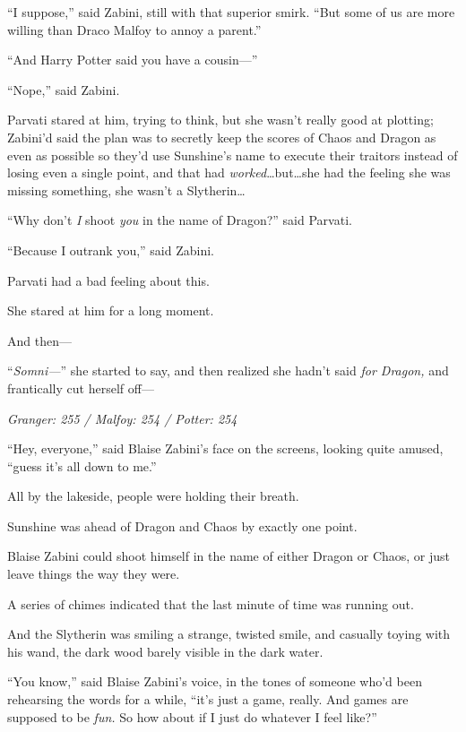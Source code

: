 “I suppose,” said Zabini, still with that superior smirk. “But some of us are more willing than Draco Malfoy to annoy a parent.”

“And Harry Potter said you have a cousin—”

“Nope,” said Zabini.

Parvati stared at him, trying to think, but she wasn’t really good at plotting; Zabini’d said the plan was to secretly keep the scores of Chaos and Dragon as even as possible so they’d use Sunshine’s name to execute their traitors instead of losing even a single point, and that had \emph{worked}…but…she had the feeling she was missing something, she wasn’t a Slytherin…

“Why don’t \emph{I} shoot \emph{you} in the name of Dragon?” said Parvati.

“Because I outrank you,” said Zabini.

Parvati had a bad feeling about this.

She stared at him for a long moment.

And then—

“\emph{Somni—}” she started to say, and then realized she hadn’t said \emph{for Dragon,} and frantically cut herself off—

\later

\emph{Granger: 255 / Malfoy: 254 / Potter: 254}

“Hey, everyone,” said Blaise Zabini’s face on the screens, looking quite amused, “guess it’s all down to me.”

All by the lakeside, people were holding their breath.

Sunshine was ahead of Dragon and Chaos by exactly one point.

Blaise Zabini could shoot himself in the name of either Dragon or Chaos, or just leave things the way they were.

A series of chimes indicated that the last minute of time was running out.

And the Slytherin was smiling a strange, twisted smile, and casually toying with his wand, the dark wood barely visible in the dark water.

“You know,” said Blaise Zabini’s voice, in the tones of someone who’d been rehearsing the words for a while, “it’s just a game, really. And games are supposed to be \emph{fun.} So how about if I just do whatever I feel like?”

